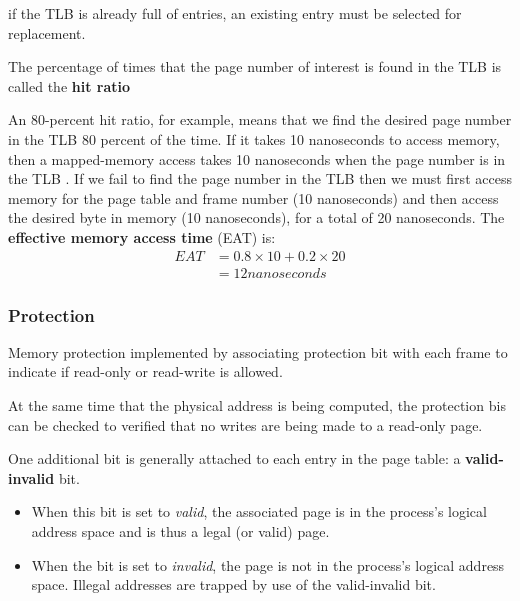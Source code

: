 \documentclass[10pt]{article}
\newcommand{\tf}{\textbf}
\newcommand{\ti}{\textit}
\begin{document}
\par{if the TLB is already full of entries, an existing entry must be selected for replacement.} \\

\par{The percentage of times that the page number of interest is found in the TLB is called the \tf{hit ratio}}

\par{An 80-percent hit ratio, for example, means that
we find the desired page number in the TLB 80 percent of the time. If it takes 10 nanoseconds to access memory, then a mapped-memory access takes 10 nanoseconds when the page number is in the TLB . If we fail to find the page
number in the TLB then we must first access memory for the page table and frame number (10 nanoseconds) and then access the desired byte in memory (10 nanoseconds), for a total of 20 nanoseconds. The \tf{effective memory access time} (EAT) is:} \\

\begin{align}
	EAT &= 0.8 \times 10 + 0.2 \times 20 \\
		&= 12 nanoseconds 
\end{align}

\subsubsection{Protection}

\par{Memory protection implemented by associating protection bit with each frame to indicate if read-only or read-write is allowed.}

\par{At the same time that the physical address is being computed, the protection bis can be checked to verified that no writes are being made to a read-only page.}

\par{One additional bit is generally attached to each entry in the page table: a \tf{valid-invalid} bit.}

\begin{itemize}
	\item When this bit is set to \ti{valid}, the associated page is in the process's logical address space and is thus a legal (or valid) page.
	\item When the bit is set to \ti{invalid}, the page is not in the process's logical address space. Illegal addresses are trapped by use of the valid-invalid bit.
\end{itemize}
\end{document}
